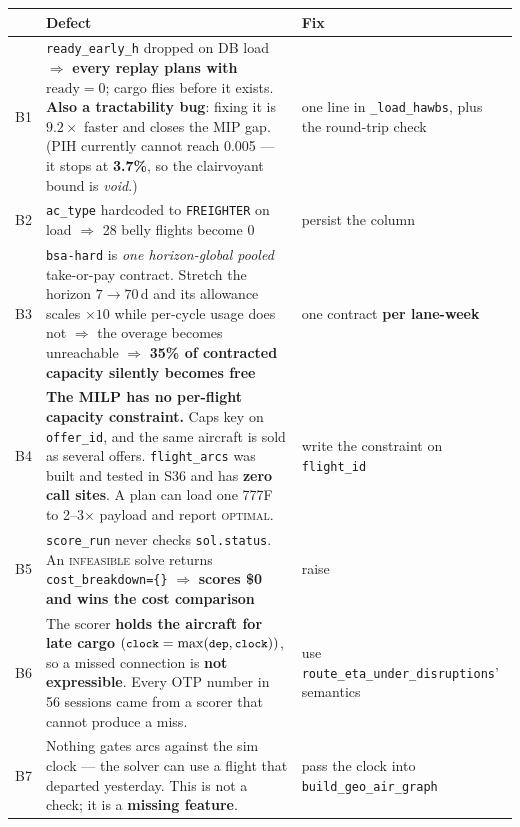 \documentclass[11pt,a4paper]{article}
\newcommand{\src}[1]{\texttt{\small #1}}
\begin{document}
\begin{center}
\begin{tabularx}{\textwidth}{@{}llL@{}}
\toprule
& \textbf{Defect} & \textbf{Fix} \\
\midrule
B1 & \src{ready\_early\_h} dropped on DB load $\Rightarrow$ \textbf{every replay plans with
$\text{ready}=0$}; cargo flies before it exists. \textbf{Also a tractability bug}: fixing it is $9.2\times$
faster and closes the MIP gap. (PIH currently cannot reach 0.005 --- it stops at \textbf{3.7\%}, so the
clairvoyant bound is \emph{void}.) & one line in \src{\_load\_hawbs}, plus the round-trip check \\[2pt]
B2 & \src{ac\_type} hardcoded to \src{FREIGHTER} on load $\Rightarrow$ 28 belly flights become 0 & persist
the column \\[2pt]
B3 & \src{bsa-hard} is \emph{one horizon-global pooled} take-or-pay contract. Stretch the horizon
$7 \to 70$\,d and its allowance scales $\times 10$ while per-cycle usage does not $\Rightarrow$ the overage
becomes unreachable $\Rightarrow$ \textbf{35\% of contracted capacity silently becomes free} & one contract
\textbf{per lane-week} \\[2pt]
B4 & \textbf{The MILP has no per-flight capacity constraint.} Caps key on \src{offer\_id}, and the same
aircraft is sold as several offers. \src{flight\_arcs} was built and tested in S36 and has \textbf{zero call
sites}. A plan can load one 777F to 2--3$\times$ payload and report \textsc{optimal}. & write the constraint
on \src{flight\_id} \\[2pt]
B5 & \src{score\_run} never checks \src{sol.status}. An \textsc{infeasible} solve returns
\src{cost\_breakdown=\{\}} $\Rightarrow$ \textbf{scores \$0 and wins the cost comparison} & raise \\[2pt]
B6 & The scorer \textbf{holds the aircraft for late cargo} $(\src{clock} = \max(\src{dep},\src{clock}))$, so
a missed connection is \textbf{not expressible}. Every OTP number in 56 sessions came from a scorer that
cannot produce a miss. & use \src{route\_eta\_under\_disruptions}' semantics \\[2pt]
B7 & Nothing gates arcs against the sim clock --- the solver can use a flight that departed yesterday.
This is not a check; it is a \textbf{missing feature}. & pass the clock into \src{build\_geo\_air\_graph} \\
\bottomrule
\end{tabularx}
\end{center}
\end{document}
